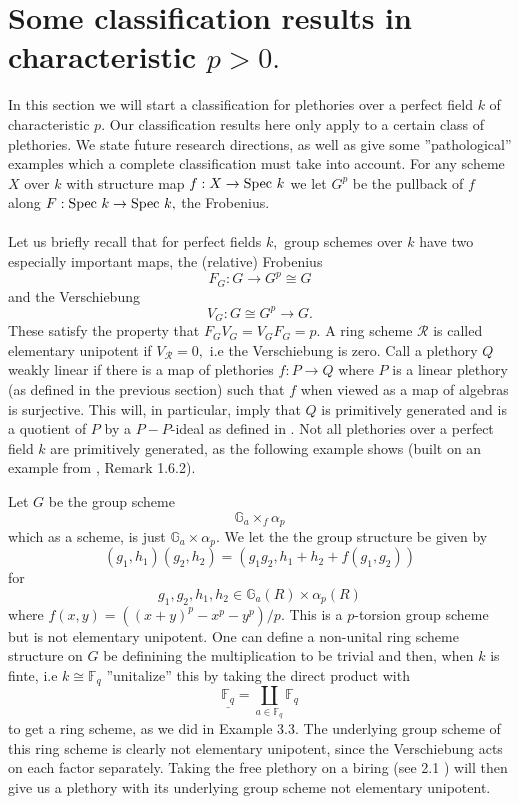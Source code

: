\documentclass[a4paper, 12pt]{amsart}
\numberwithin{equation}{section}
\theoremstyle{definition}
\begin{document}
\section{Some classification results in characteristic $p >0.$}
\noindent In this section we will start a classification for plethories over a perfect field $k$ of characteristic $p.$ Our classification results here only apply to a certain class of plethories. We state future research directions, as well as give some ''pathological'' examples which a complete classification must take into account. For any scheme $X$ over $k$  with structure map $f:X \rightarrow \text{Spec } k$ we let $G^p $ be the pullback of $f$ along $F:\text{Spec } k \rightarrow \text{Spec } k,$ the Frobenius.
\\ \noindent \\ Let us briefly recall that for perfect fields $k,$ group schemes over $k$ have two especially important maps, the (relative) Frobenius $$F_G: G \rightarrow G^p \cong G$$ and the Verschiebung $$V_G:G \cong G^p \rightarrow G.$$ These satisfy the property that $F_GV_G=V_GF_G=p.$ A ring scheme $\mathcal{R}$ is called elementary unipotent if $V_{\mathcal{R}}=0,$ i.e the Verschiebung is zero. Call a plethory $Q$ weakly linear if there is a map of plethories $f:P \rightarrow Q$ where $P$ is a linear plethory (as defined in the previous section) such that $f$ when viewed as a map of algebras is surjective. This will, in particular, imply that $Q$ is primitively generated and is a quotient of $P$ by a $P-P$-ideal as defined in \cite{BW}. Not all plethories over a perfect field $k$ are primitively generated, as the following example shows (built on an example from \cite{Takeuchi}, Remark 1.6.2).
\begin{example}
Let $G$ be the group scheme $$\mathbb{G}_a \times_f \alpha_p$$ which as a scheme, is just $\mathbb{G}_a \times \alpha_p.$  We let the the group structure be given by $$(g_1,h_1)(g_2,h_2) = (g_1g_2,h_1+h_2+f(g_1,g_2))$$  for $$g_1,g_2,h_1,h_2 \in \mathbb{G}_a(R) \times \alpha_p(R)$$ where $f(x,y) = ((x+y)^p-x^p-y^p)/p.$ This is a $p$-torsion group scheme but is not elementary unipotent. One can define a non-unital ring scheme structure on $G$ be definining the multiplication to be trivial and then, when $k$ is finte, i.e $k \cong \mathbb{F}_q$  ''unitalize'' this by taking the direct product with $$\underline{\mathbb{F}_q} = \coprod_{a \in \mathbb{F}_q} \mathbb{F}_q$$ to get a ring scheme, as we did in Example 3.3. The underlying group scheme of this ring scheme is clearly not elementary unipotent, since the Verschiebung acts on each factor separately. Taking the free plethory on a biring (see \cite{BW} 2.1 ) will then give us a plethory with its underlying group scheme not elementary unipotent.
\end{example}
\end{document}
